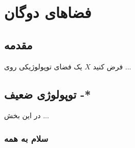 \chapter{فضاهای دوگان }
\thispagestyle{empty}
\section{مقدمه}
فرض کنید $X$ یک فضای توپولوژیکی روی ...
\section{توپولوژی ضعیف -*}
در این بخش ...

\subsection{سلام به همه}